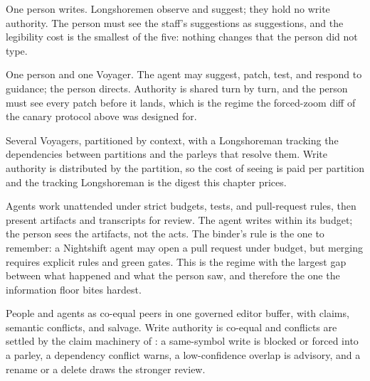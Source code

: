 \documentclass[11pt,a4paper]{article}
\theoremstyle{definition}
\theoremstyle{plain}
\newcounter{protocol}[section]
\begin{document}
\begin{description}[leftmargin=1.4em,itemsep=3pt]
  \item[Solo with staff] One person writes. Longshoremen observe and suggest;
  they hold no write authority. The person must see the staff's suggestions
  as suggestions, and the legibility cost is the smallest of the five:
  nothing changes that the person did not type.
  \item[Pair with agent] One person and one Voyager. The agent may suggest,
  patch, test, and respond to guidance; the person directs. Authority is
  shared turn by turn, and the person must see every patch before it lands,
  which is the regime the forced-zoom diff of the canary protocol above was
  designed for.
  \item[Ensemble] Several Voyagers, partitioned by context, with a
  Longshoreman tracking the dependencies between partitions and the parleys
  that resolve them. Write authority is distributed by the partition, so the
  cost of seeing is paid per partition and the tracking Longshoreman is the
  digest this chapter prices.
  \item[Nightshift] Agents work unattended under strict budgets, tests, and
  pull-request rules, then present artifacts and transcripts for review. The
  agent writes within its budget; the person sees the artifacts, not the
  acts. The binder's rule is the one to remember: a Nightshift agent may open
  a pull request under budget, but merging requires explicit rules and green
  gates. This is the regime with the largest gap between what happened and
  what the person saw, and therefore the one the information floor bites
  hardest.
  \item[Harbor co-edit] People and agents as co-equal peers in one governed
  editor buffer, with claims, semantic conflicts, and salvage. Write
  authority is co-equal and conflicts are settled by the claim machinery of
  : a same-symbol write is blocked or
  forced into a parley, a dependency conflict warns, a low-confidence overlap
  is advisory, and a rename or a delete draws the stronger review.
\end{description}
\end{document}
